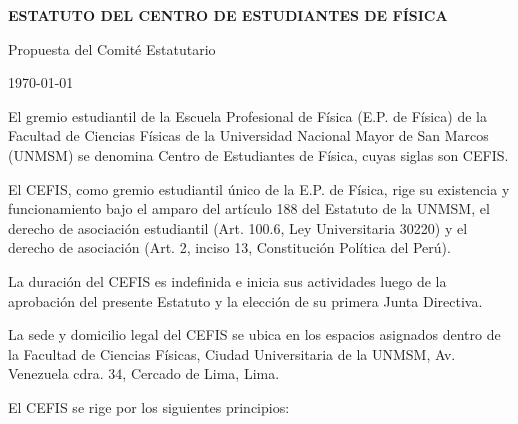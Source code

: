 \documentclass[11pt]{article}
\newcommand{\DocNom}{ESTATUTO DEL CENTRO DE ESTUDIANTES DE FÍSICA}
\newcommand{\DocFecha}{\today}
\newcommand{\DocAutor}{Propuesta del Comité Estatutario}
\begin{document}
\begin{titlepage}
  \null
  \vfill
  \begin{center}
    {\sffamily\bfseries\LARGE \DocNom\par}
    {\sffamily\Large \DocAutor\par}
    {\sffamily\large \DocFecha\par}
  \end{center}
  \vfill
\end{titlepage}

\tableofcontents
\clearpage
{}



El gremio estudiantil de la Escuela Profesional de Física (E.P. de Física) de la Facultad de Ciencias Físicas de la Universidad Nacional Mayor de San Marcos (UNMSM) se denomina Centro de Estudiantes de Física, cuyas siglas son CEFIS.

El CEFIS, como gremio estudiantil único de la E.P. de Física, rige su existencia y funcionamiento bajo el amparo del artículo 188 del Estatuto de la UNMSM, el derecho de asociación estudiantil (Art. 100.6, Ley Universitaria 30220) y el derecho de asociación (Art. 2, inciso 13, Constitución Política del Perú).

La duración del CEFIS es indefinida e inicia sus actividades luego de la aprobación del presente Estatuto y la elección de su primera Junta Directiva.

La sede y domicilio legal del CEFIS se ubica en los espacios asignados dentro de la Facultad de Ciencias Físicas, Ciudad Universitaria de la UNMSM, Av. Venezuela cdra. 34, Cercado de Lima, Lima.

El CEFIS se rige por los siguientes principios:
\begin{artitems}[nosep]
\end{artitems}
\end{document}
